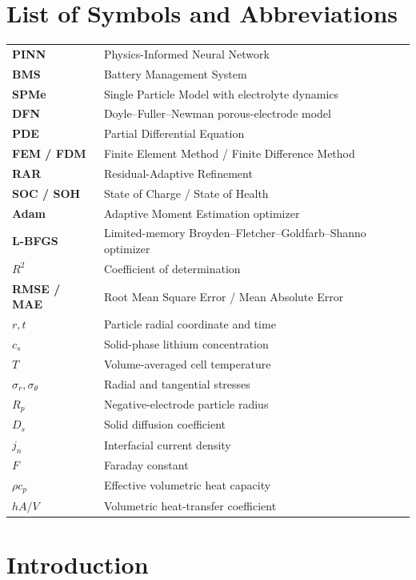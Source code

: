 \documentclass[14pt,a4paper,oneside]{extreport}
\renewcommand{\arraystretch}{1.25}
\begin{document}
\chapter*{List of Symbols and Abbreviations}
\begingroup
{}
\renewcommand{\arraystretch}{1.0}
\begin{longtable}{>{\bfseries}p{}p{}}
PINN & Physics-Informed Neural Network\\
BMS & Battery Management System\\
SPMe & Single Particle Model with electrolyte dynamics\\
DFN & Doyle--Fuller--Newman porous-electrode model\\
PDE & Partial Differential Equation\\
FEM / FDM & Finite Element Method / Finite Difference Method\\
RAR & Residual-Adaptive Refinement\\
SOC / SOH & State of Charge / State of Health\\
Adam & Adaptive Moment Estimation optimizer\\
L-BFGS & Limited-memory Broyden--Fletcher--Goldfarb--Shanno optimizer\\
$R^2$ & Coefficient of determination\\
RMSE / MAE & Root Mean Square Error / Mean Absolute Error\\
$r,t$ & Particle radial coordinate and time\\
$c_s$ & Solid-phase lithium concentration\\
$T$ & Volume-averaged cell temperature\\
$\sigma_r,\sigma_{\theta}$ & Radial and tangential stresses\\
$R_p$ & Negative-electrode particle radius\\
$D_s$ & Solid diffusion coefficient\\
$j_n$ & Interfacial current density\\
$F$ & Faraday constant\\
$\rho c_p$ & Effective volumetric heat capacity\\
$hA/V$ & Volumetric heat-transfer coefficient\\
\end{longtable}
\endgroup

\clearpage
{}
\setcounter{page}{1}

\chapter{Introduction}
\end{document}
